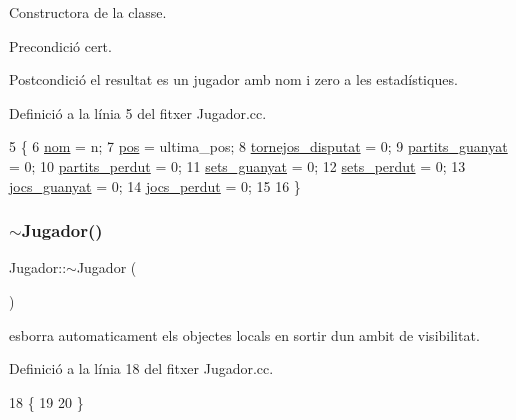 Constructora de la classe. 

\begin{DoxyPrecond}{Precondició}
cert. 
\end{DoxyPrecond}
\begin{DoxyPostcond}{Postcondició}
el resultat es un jugador amb nom i zero a les estadístiques. 
\end{DoxyPostcond}


Definició a la línia 5 del fitxer Jugador.\+cc.


\begin{DoxyCode}
5                                          \{
6     \mbox{\hyperlink{class_jugador_afd6bec98df8ebb3d2db3ef583a76cfa1}{nom}} = n;
7     \mbox{\hyperlink{class_jugador_a25a7eeb0d334b2fe60bb490704c6626d}{pos}} = ultima\_pos;
8     \mbox{\hyperlink{class_jugador_a2ef0821abd64385a58561b039c37a469}{tornejos\_disputat}} = 0;
9     \mbox{\hyperlink{class_jugador_a6bf9a674be86bfce7945f7c0dfbe531f}{partits\_guanyat}} = 0;
10     \mbox{\hyperlink{class_jugador_ad1e6a56bea30a1449dbb37871c288fcf}{partits\_perdut}} = 0;
11     \mbox{\hyperlink{class_jugador_a396b226c722425d387f36e239fc9855c}{sets\_guanyat}} = 0;
12     \mbox{\hyperlink{class_jugador_a7c9fcb3ec52c2c400e7cf8faaf945426}{sets\_perdut}} = 0;
13     \mbox{\hyperlink{class_jugador_a0eb97835e7dd3143f626c1d15edb7392}{jocs\_guanyat}} = 0;
14     \mbox{\hyperlink{class_jugador_a04e5cf90e57c490b4c088e29763479f7}{jocs\_perdut}} = 0;
15     
16 \}
\end{DoxyCode}
\mbox{\label{class_jugador_a9db1d422fe3b675f92d9fd687b1f42c4}} 
\subsubsection{\texorpdfstring{$\sim$\+Jugador()}{~Jugador()}}
{\footnotesize\ttfamily Jugador\+::$\sim$\+Jugador (\begin{DoxyParamCaption}{ }\end{DoxyParamCaption})}



esborra automaticament els objectes locals en sortir d\textquotesingle{}un ambit de visibilitat. 



Definició a la línia 18 del fitxer Jugador.\+cc.


\begin{DoxyCode}
18                   \{
19     
20 \}
\end{DoxyCode}


